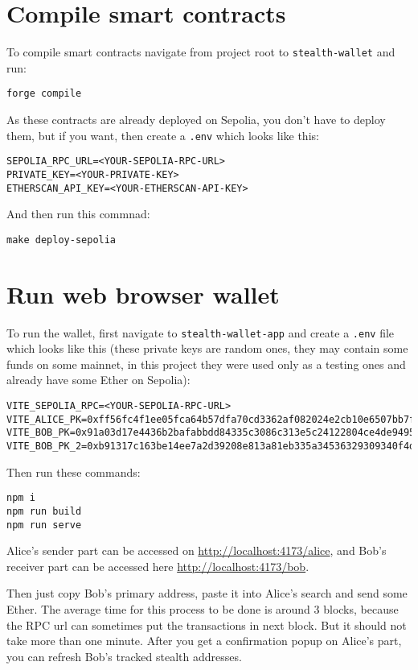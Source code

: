 \section{Compile smart contracts}

To compile smart contracts navigate from project root to \texttt{stealth-wallet} and run:
\begin{verbatim}
forge compile
\end{verbatim}

As these contracts are already deployed on Sepolia, you don't have to deploy them,
but if you want, then create a \texttt{.env} which looks like this:

\begin{verbatim}
SEPOLIA_RPC_URL=<YOUR-SEPOLIA-RPC-URL>
PRIVATE_KEY=<YOUR-PRIVATE-KEY>
ETHERSCAN_API_KEY=<YOUR-ETHERSCAN-API-KEY>
\end{verbatim}

And then run this commnad:

\begin{verbatim}
make deploy-sepolia
\end{verbatim}

\section{Run web browser wallet}\label{section:web}

To run the wallet, first navigate to \texttt{stealth-wallet-app} and create a
\texttt{.env} file which looks like this (these private keys are random ones,
they may contain some funds on some mainnet, in this project they were
used only as a testing ones and already have some Ether on Sepolia):

\begin{small}
\begin{verbatim}
VITE_SEPOLIA_RPC=<YOUR-SEPOLIA-RPC-URL>
VITE_ALICE_PK=0xff56fc4f1ee05fca64b57dfa70cd3362af082024e2cb10e6507bb7fa0781887d
VITE_BOB_PK=0x91a03d17e4436b2bafabbdd84335c3086c313e5c24122804ce4de94957502981
VITE_BOB_PK_2=0xb91317c163be14ee7a2d39208e813a81eb335a34536329309340f4da821840dc
\end{verbatim}
\end{small}

\pagebreak
Then run these commands:
\begin{verbatim}
npm i
npm run build
npm run serve
\end{verbatim}

Alice's sender part can be accessed on \url{http://localhost:4173/alice}, and
Bob's receiver part can be accessed here \url{http://localhost:4173/bob}.

Then just copy Bob's primary address, paste it into Alice's search and send some
Ether. The average time for this process to be done is around 3 blocks, because
the RPC url can sometimes put the transactions in next block. But it should not
take more than one minute. After you get a confirmation popup on Alice's part,
you can refresh Bob's tracked stealth addresses.
